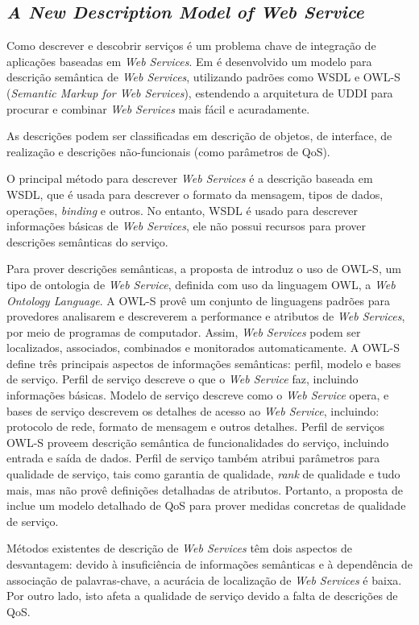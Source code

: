 \subsection{\textit{A New Description Model of Web Service} \cite{wu2009new}} \label{sec:ws-description-model}

Como descrever e descobrir serviços é um problema chave de integração de aplicações baseadas em \textit{Web Services}. Em \cite{wu2009new} é desenvolvido um modelo para descrição semântica de \textit{Web Services}, utilizando padrões como WSDL e OWL-S (\textit{Semantic Markup for Web Services}), estendendo a arquitetura de UDDI para procurar e combinar \textit{Web Services} mais fácil e acuradamente.

As descrições podem ser classificadas em descrição de objetos, de interface, de realização e descrições não-funcionais (como parâmetros de QoS).

O principal método para descrever \textit{Web Services} é a descrição baseada em WSDL, que é usada para descrever o formato da mensagem, tipos de dados, operações, \textit{binding} e outros. No entanto, WSDL é usado para descrever informações básicas de \textit{Web Services}, ele não possui recursos para prover descrições semânticas do serviço.

Para prover descrições semânticas, a proposta de \cite{wu2009new} introduz o uso de OWL-S, um tipo de ontologia de \textit{Web Service}, definida com uso da linguagem OWL, a \textit{Web Ontology Language}. A OWL-S provê um conjunto de linguagens padrões para provedores analisarem e descreverem a performance e atributos de \textit{Web Services}, por meio de programas de computador. Assim, \textit{Web Services} podem ser localizados, associados, combinados e monitorados automaticamente. A OWL-S define três principais aspectos de informações semânticas: perfil, modelo e bases de serviço. Perfil de serviço descreve o que o \textit{Web Service} faz, incluindo informações básicas. Modelo de serviço descreve como o \textit{Web Service} opera, e bases de serviço descrevem os detalhes de acesso ao \textit{Web Service}, incluindo: protocolo de rede, formato de mensagem e outros detalhes. Perfil de serviços OWL-S proveem descrição semântica de funcionalidades do serviço, incluindo entrada e saída de dados. Perfil de serviço também atribui parâmetros para qualidade de serviço, tais como garantia de qualidade, \textit{rank} de qualidade e tudo mais, mas não provê definições detalhadas de atributos. Portanto, a proposta de \cite{wu2009new} inclue um modelo detalhado de QoS para prover medidas concretas de qualidade de serviço.

Métodos existentes de descrição de \textit{Web Services} têm dois aspectos de desvantagem: devido à insuficiência de informações semânticas e à dependência de associação de palavras-chave, a acurácia de localização de \textit{Web Services} é baixa. Por outro lado, isto afeta a qualidade de serviço devido a falta de descrições de QoS.


